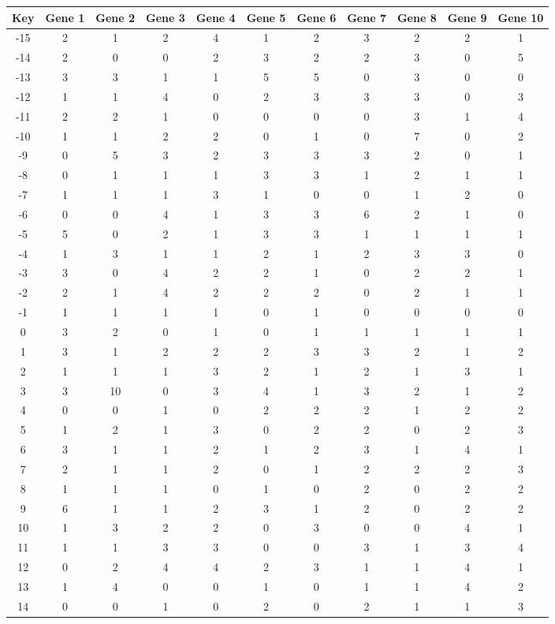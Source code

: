 \begin{tabular}{|c|c|c|c|c|c|c|c|c|c|c|}
\hline
Key & Gene 1 & Gene 2 & Gene 3 & Gene 4 & Gene 5 & Gene 6 & Gene 7 & Gene 8 & Gene 9 & Gene 10 \\
\hline
-15 & 2 & 1 & 2 & 4 & 1 & 2 & 3 & 2 & 2 & 1 \\
-14 & 2 & 0 & 0 & 2 & 3 & 2 & 2 & 3 & 0 & 5 \\
-13 & 3 & 3 & 1 & 1 & 5 & 5 & 0 & 3 & 0 & 0 \\
-12 & 1 & 1 & 4 & 0 & 2 & 3 & 3 & 3 & 0 & 3 \\
-11 & 2 & 2 & 1 & 0 & 0 & 0 & 0 & 3 & 1 & 4 \\
-10 & 1 & 1 & 2 & 2 & 0 & 1 & 0 & 7 & 0 & 2 \\
-9 & 0 & 5 & 3 & 2 & 3 & 3 & 3 & 2 & 0 & 1 \\
-8 & 0 & 1 & 1 & 1 & 3 & 3 & 1 & 2 & 1 & 1 \\
-7 & 1 & 1 & 1 & 3 & 1 & 0 & 0 & 1 & 2 & 0 \\
-6 & 0 & 0 & 4 & 1 & 3 & 3 & 6 & 2 & 1 & 0 \\
-5 & 5 & 0 & 2 & 1 & 3 & 3 & 1 & 1 & 1 & 1 \\
-4 & 1 & 3 & 1 & 1 & 2 & 1 & 2 & 3 & 3 & 0 \\
-3 & 3 & 0 & 4 & 2 & 2 & 1 & 0 & 2 & 2 & 1 \\
-2 & 2 & 1 & 4 & 2 & 2 & 2 & 0 & 2 & 1 & 1 \\
-1 & 1 & 1 & 1 & 1 & 0 & 1 & 0 & 0 & 0 & 0 \\
0 & 3 & 2 & 0 & 1 & 0 & 1 & 1 & 1 & 1 & 1 \\
1 & 3 & 1 & 2 & 2 & 2 & 3 & 3 & 2 & 1 & 2 \\
2 & 1 & 1 & 1 & 3 & 2 & 1 & 2 & 1 & 3 & 1 \\
3 & 3 & 10 & 0 & 3 & 4 & 1 & 3 & 2 & 1 & 2 \\
4 & 0 & 0 & 1 & 0 & 2 & 2 & 2 & 1 & 2 & 2 \\
5 & 1 & 2 & 1 & 3 & 0 & 2 & 2 & 0 & 2 & 3 \\
6 & 3 & 1 & 1 & 2 & 1 & 2 & 3 & 1 & 4 & 1 \\
7 & 2 & 1 & 1 & 2 & 0 & 1 & 2 & 2 & 2 & 3 \\
8 & 1 & 1 & 1 & 0 & 1 & 0 & 2 & 0 & 2 & 2 \\
9 & 6 & 1 & 1 & 2 & 3 & 1 & 2 & 0 & 2 & 2 \\
10 & 1 & 3 & 2 & 2 & 0 & 3 & 0 & 0 & 4 & 1 \\
11 & 1 & 1 & 3 & 3 & 0 & 0 & 3 & 1 & 3 & 4 \\
12 & 0 & 2 & 4 & 4 & 2 & 3 & 1 & 1 & 4 & 1 \\
13 & 1 & 4 & 0 & 0 & 1 & 0 & 1 & 1 & 4 & 2 \\
14 & 0 & 0 & 1 & 0 & 2 & 0 & 2 & 1 & 1 & 3 \\
\hline
\end{tabular}